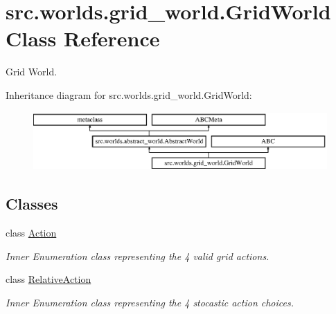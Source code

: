 \hypertarget{classsrc_1_1worlds_1_1grid__world_1_1_grid_world}{}\section{src.\+worlds.\+grid\+\_\+world.\+Grid\+World Class Reference}
\label{classsrc_1_1worlds_1_1grid__world_1_1_grid_world}


Grid World.  


Inheritance diagram for src.\+worlds.\+grid\+\_\+world.\+Grid\+World\+:\begin{figure}[H]
\begin{center}
\leavevmode
\includegraphics[height=2.240000cm]{classsrc_1_1worlds_1_1grid__world_1_1_grid_world}
\end{center}
\end{figure}
\subsection*{Classes}
\begin{DoxyCompactItemize}
\item 
class \hyperlink{classsrc_1_1worlds_1_1grid__world_1_1_grid_world_1_1_action}{Action}
\begin{DoxyCompactList}\small\item\em Inner Enumeration class representing the 4 valid grid actions. \end{DoxyCompactList}\item 
class \hyperlink{classsrc_1_1worlds_1_1grid__world_1_1_grid_world_1_1_relative_action}{Relative\+Action}
\begin{DoxyCompactList}\small\item\em Inner Enumeration class representing the 4 stocastic action choices. \end{DoxyCompactList}\end{DoxyCompactItemize}
